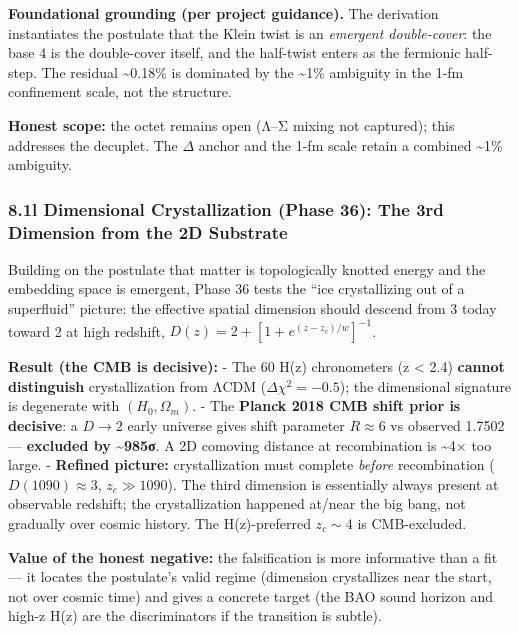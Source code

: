 \documentclass[
]{article}
\begin{document}
\textbf{Foundational grounding (per project guidance).} The derivation
instantiates the postulate that the Klein twist is an \emph{emergent
double-cover}: the base 4 is the double-cover itself, and the half-twist
enters as the fermionic half-step. The residual \textasciitilde0.18\% is
dominated by the \textasciitilde1\% ambiguity in the 1-fm confinement
scale, not the structure.

\textbf{Honest scope:} the octet remains open (Λ--Σ mixing not
captured); this addresses the decuplet. The \(\Delta\) anchor and the
1-fm scale retain a combined \textasciitilde1\% ambiguity.

\subsubsection{8.1l Dimensional Crystallization (Phase 36): The 3rd
Dimension from the 2D
Substrate}\label{l-dimensional-crystallization-phase-36-the-3rd-dimension-from-the-2d-substrate}

Building on the postulate that matter is topologically knotted energy
and the embedding space is emergent, Phase 36 tests the ``ice
crystallizing out of a superfluid'' picture: the effective spatial
dimension should descend from 3 today toward 2 at high redshift,
\(D(z) = 2 + [1+e^{(z-z_c)/w}]^{-1}\).

\textbf{Result (the CMB is decisive):} - The 60 H(z) chronometers (z
\textless{} 2.4) \textbf{cannot distinguish} crystallization from ΛCDM
(\(\Delta\chi^2 = -0.5\)); the dimensional signature is degenerate with
\((H_0,\Omega_m)\). - The \textbf{Planck 2018 CMB shift prior is
decisive}: a \(D \to 2\) early universe gives shift parameter
\(R \approx 6\) vs observed 1.7502 --- \textbf{excluded by
\textasciitilde985σ}. A 2D comoving distance at recombination is
\textasciitilde4× too large. - \textbf{Refined picture:} crystallization
must complete \emph{before} recombination (\(D(1090) \approx 3\),
\(z_c \gg 1090\)). The third dimension is essentially always present at
observable redshift; the crystallization happened at/near the big bang,
not gradually over cosmic history. The H(z)-preferred \(z_c \sim 4\) is
CMB-excluded.

\textbf{Value of the honest negative:} the falsification is more
informative than a fit --- it locates the postulate's valid regime
(dimension crystallizes near the start, not over cosmic time) and gives
a concrete target (the BAO sound horizon and high-z H(z) are the
discriminators if the transition is subtle).
\end{document}
